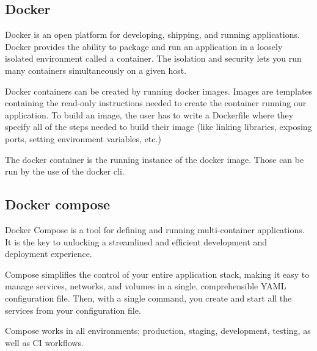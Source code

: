 	\subsection{Docker}
	Docker is an open platform for developing, shipping, and running applications. \cite{docker}
	Docker provides the ability to package and run an application in a loosely isolated environment 
	called a container. The isolation and security lets you run many containers simultaneously 
	on a given host.

	Docker containers can be created by running docker images. Images are templates 
	containing the read-only instructions needed 
	to create the container running our application. To build an image, the user has to write a Dockerfile
	where they specify all of the steps needed to build their image (like linking libraries, exposing ports, 
	setting environment variables, etc.)

	The docker container is the running instance of the docker image. Those can be run by the use of the docker cli.


	\subsection{Docker compose}
	Docker Compose \cite{dockercompose} is a tool for defining and running multi-container applications. It is the key to unlocking a streamlined and efficient development and deployment experience.

	Compose simplifies the control of your entire application stack, making it easy to manage services, networks, and volumes in a single, comprehensible YAML configuration file. Then, with a single command, you create and start all the services from your configuration file.

	Compose works in all environments; production, staging, development, testing, as well as CI workflows.
